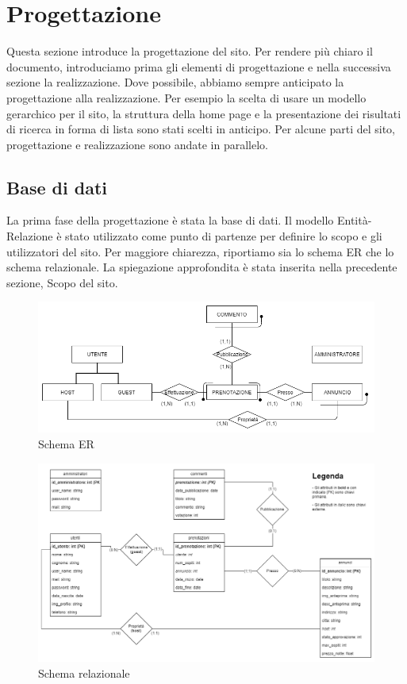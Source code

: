 \documentclass[1_relazione.tex]{subfiles}
\begin{document}
    \section{Progettazione}
    Questa sezione introduce la progettazione del sito. Per rendere pi\`{u} chiaro il documento, introduciamo prima gli elementi di progettazione e nella successiva sezione la realizzazione. Dove possibile, abbiamo sempre anticipato la progettazione alla realizzazione. Per esempio la scelta di usare un modello gerarchico per il sito, la struttura della home page e la presentazione dei risultati di ricerca in forma di lista sono stati scelti in anticipo. Per alcune parti del sito, progettazione e realizzazione sono andate in parallelo.

    \subsection{Base di dati}
    La prima fase della progettazione è stata la base di dati. Il modello Entità-Relazione è stato utilizzato come punto di partenze per definire lo scopo e gli utilizzatori del sito. Per maggiore chiarezza, riportiamo sia lo schema ER che lo schema relazionale. La spiegazione approfondita è stata inserita nella precedente sezione, Scopo del sito.

    \begin{figure}[h!]
        \centering
        \includegraphics[scale=0.5]{immagini/schema_ER-2}
        \caption{Schema ER}
    \end{figure}

    \begin{figure}[h!]
        \centering
        \includegraphics[scale=0.4]{immagini/schema_relazionale-2}
        \caption{Schema relazionale}
    \end{figure}
\end{document}

